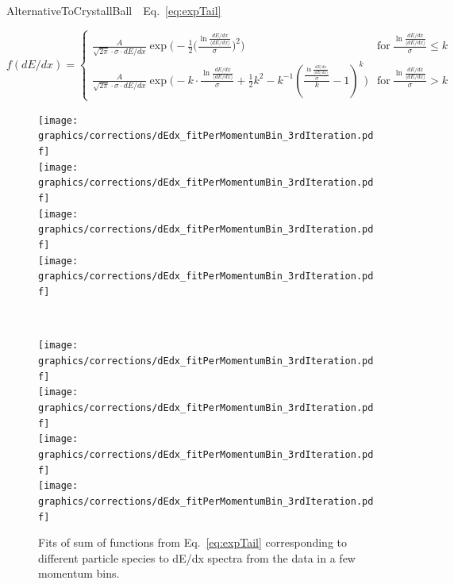 AlternativeToCrystallBall~\cite{AlternativeToCrystallBall}~Eq.~\eqref{eq:expTail}

\begin{equation}\label{eq:expTail}
	f(dE/dx)=\left\{
                \begin{array}{ll}
                  \frac{A}{\sqrt{2\pi}\cdot \sigma\cdot dE/dx}\exp{\Bigg(-\frac{1}{2}\Big(\frac{\ln{\frac{dE/dx}{\langle dE/dx\rangle}}}{\sigma}\Big)^{2}\Bigg)} & \textrm{for}~\frac{\ln{\frac{dE/dx}{\langle dE/dx\rangle}}}{\sigma} \leq k \\
                  \frac{A}{\sqrt{2\pi}\cdot \sigma\cdot dE/dx}\exp{\Bigg(-k\cdot \frac{\ln{\frac{dE/dx}{\langle dE/dx\rangle}}}{\sigma} + \frac{1}{2}k^{2} - k^{-1}\left(\frac{\frac{\ln{\frac{dE/dx}{\langle dE/dx\rangle}}}{\sigma}}{k}-1\right)^{k} \Bigg)} & \textrm{for}~\frac{\ln{\frac{dE/dx}{\langle dE/dx\rangle}}}{\sigma} > k
                \end{array}
              \right.
\end{equation}



\begin{figure}[hb]
\centering
\parbox{0.495\textwidth}{
  \centering
  \texttt{[image: graphics/corrections/dEdx\_fitPerMomentumBin\_3rdIteration.pdf]}\\
  \texttt{[image: graphics/corrections/dEdx\_fitPerMomentumBin\_3rdIteration.pdf]}\\
  \texttt{[image: graphics/corrections/dEdx\_fitPerMomentumBin\_3rdIteration.pdf]}\\
  \texttt{[image: graphics/corrections/dEdx\_fitPerMomentumBin\_3rdIteration.pdf]}
}~
\parbox{0.495\textwidth}{
  \centering
  \texttt{[image: graphics/corrections/dEdx\_fitPerMomentumBin\_3rdIteration.pdf]}\\
  \texttt{[image: graphics/corrections/dEdx\_fitPerMomentumBin\_3rdIteration.pdf]}\\
  \texttt{[image: graphics/corrections/dEdx\_fitPerMomentumBin\_3rdIteration.pdf]}\\
  \texttt{[image: graphics/corrections/dEdx\_fitPerMomentumBin\_3rdIteration.pdf]}
}%
\caption[Fits to dE/dx spectra from the data.]{Fits of sum of functions from Eq.~\eqref{eq:expTail} corresponding to different particle species to dE/dx spectra from the data in a few momentum bins.}\label{fig:dEdxFits}
\end{figure}



